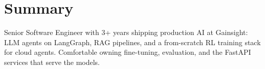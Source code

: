 \section{Summary}
\small Senior Software Engineer with 3+ years shipping production AI at Gainsight: LLM agents on LangGraph, RAG pipelines, and a from-scratch RL training stack for cloud agents. Comfortable owning fine-tuning, evaluation, and the FastAPI services that serve the models.
\vspace{2pt}
